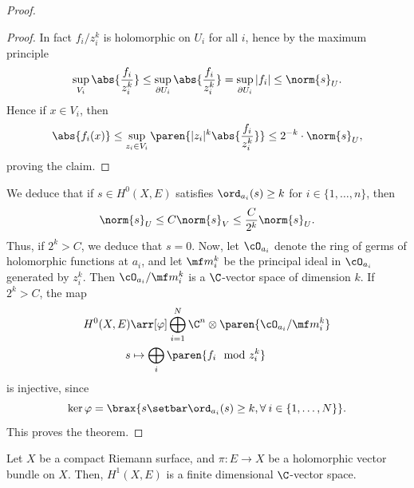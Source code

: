 \documentclass[11pt]{report}
\begin{document}
\begin{proof}
\begin{claim}
    \end{claim}
    \begin{proof}
        In fact $f_i/z_i^k$ is holomorphic on $U_i$ for all $i$, hence by the maximum principle
        \[
        \sup_{V_i}\abs{\frac{f_i}{z_i^k}} \leq \sup_{\partial U_i} \abs{\frac{f_i}{z_i^k}} = \sup_{\partial U_i}|f_i| \leq \norm{s}_U.
        \]
        Hence if $x \in V_i$, then
        \[
        \abs{f_i(x)} \leq \sup_{z_i \in V_i}\paren{|z_i|^k\abs{\frac{f_i}{z_i^k}} } \leq 2^{-k}\cdot \norm{s}_U,
        \]
        proving the claim.
    \end{proof}
    We deduce that if $s \in H^0(X,E)$ satisfies $\ord_{a_i}(s) \ge k$ for $i \in \{1,\dots,n\}$, then \[
    \norm{s}_U \leq C\norm{s}_V \leq \frac{C}{2^k}\norm{s}_U.
    \]
    Thus, if $2^k>C$, we deduce that $s=0$. Now, let $\cO_{a_i}$ denote the ring of germs of holomorphic functions at $a_i$, and let $\mf m_i^k$ be the principal ideal in $\cO_{a_i}$ generated by $z_i^k$. Then $\cO_{a_i}/\mf m_i^k$ is a $\C$-vector space of dimension $k$. If $2^k>C$, the map
    \begin{align*}
        H^0(X,E) &\arr[\varphi]\bigoplus_{i=1}^N \C^n \otimes \paren{\cO_{a_i}/\mf m_i^k}
        \\ s &\mapsto \bigoplus _i \paren{f_i \mod z_i^k}
    \end{align*}
    is injective, since
    \[
    \ker \varphi = \brax{s \setbar \ord_{a_i}(s) \ge k, \forall \: i \in \{1,\dots,N\} }.
    \]
    This proves the theorem.
\end{proof}

\begin{thm}[][label=thm:H1-is-finite]
    Let $X$ be a compact Riemann surface, and $\pi:E \to X$ be a holomorphic vector bundle on $X$. Then, $H^1(X,E)$ is a finite dimensional $\C$-vector space.
\end{thm}
\end{document}
